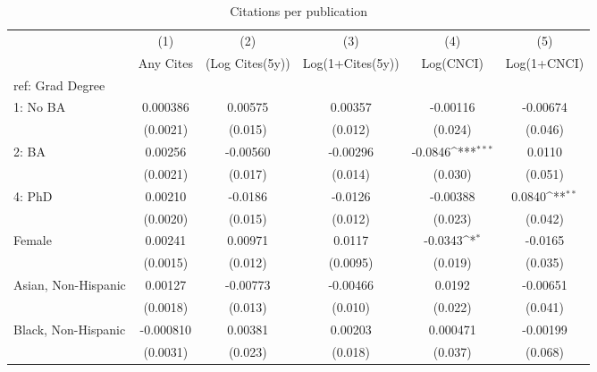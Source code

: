\begin{table}[htbp]\centering
\def\sym#1{\ifmmode^{#1}\else\(^{#1}\)\fi}
\caption{Citations per publication}
\begin{tabular}{l*{5}{c}}
\hline\hline
  &\multicolumn{1}{c}{(1)}&\multicolumn{1}{c}{(2)}&\multicolumn{1}{c}{(3)}&\multicolumn{1}{c}{(4)}&\multicolumn{1}{c}{(5)}\\
  &\multicolumn{1}{c}{Any Cites}&\multicolumn{1}{c}{(Log Cites(5y))}&\multicolumn{1}{c}{Log(1+Cites(5y))}&\multicolumn{1}{c}{Log(CNCI)}&\multicolumn{1}{c}{Log(1+CNCI)}\\
\hline
ref: Grad Degree&                     &                     &                     &                     &                     \\
[1em]
1: No BA&    0.000386         &     0.00575         &     0.00357         &    -0.00116         &    -0.00674         \\
  &    (0.0021)         &     (0.015)         &     (0.012)         &     (0.024)         &     (0.046)         \\
[1em]
2: BA&     0.00256         &    -0.00560         &    -0.00296         &     -0.0846\sym{***}&      0.0110         \\
  &    (0.0021)         &     (0.017)         &     (0.014)         &     (0.030)         &     (0.051)         \\
[1em]
4: PhD&     0.00210         &     -0.0186         &     -0.0126         &    -0.00388         &      0.0840\sym{**} \\
  &    (0.0020)         &     (0.015)         &     (0.012)         &     (0.023)         &     (0.042)         \\
[1em]
Female&     0.00241         &     0.00971         &      0.0117         &     -0.0343\sym{*}  &     -0.0165         \\
  &    (0.0015)         &     (0.012)         &    (0.0095)         &     (0.019)         &     (0.035)         \\
[1em]
Asian, Non-Hispanic&     0.00127         &    -0.00773         &    -0.00466         &      0.0192         &    -0.00651         \\
  &    (0.0018)         &     (0.013)         &     (0.010)         &     (0.022)         &     (0.041)         \\
[1em]
Black, Non-Hispanic&   -0.000810         &     0.00381         &     0.00203         &    0.000471         &    -0.00199         \\
  &    (0.0031)         &     (0.023)         &     (0.018)         &     (0.037)         &     (0.068)         \\

\end{tabular}
\end{table}
